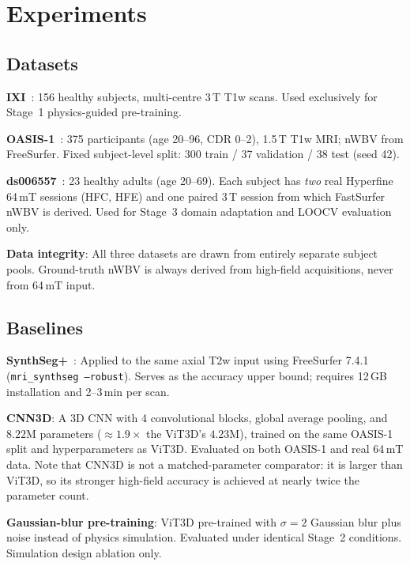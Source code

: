\documentclass[12pt,a4paper]{article}
\begin{document}
\section{Experiments}
\label{sec:experiments}

\subsection{Datasets}

\textbf{IXI}~\cite{ixi2017}: 156 healthy subjects, multi-centre 3\,T T1w
scans. Used exclusively for Stage~1 physics-guided pre-training.

\textbf{OASIS-1}~\cite{marcus2007oasis}: 375 participants (age 20--96,
CDR 0--2), 1.5\,T T1w MRI; nWBV from FreeSurfer. Fixed subject-level split:
300 train / 37 validation / 38 test (seed 42).

\textbf{ds006557}~\cite{vasa2025}: 23 healthy adults (age 20--69). Each
subject has \emph{two} real Hyperfine 64\,mT sessions (HFC, HFE) and one
paired 3\,T session from which FastSurfer nWBV is derived. Used for Stage~3
domain adaptation and LOOCV evaluation only.

\textbf{Data integrity}: All three datasets are drawn from entirely separate
subject pools. Ground-truth nWBV is always derived from high-field
acquisitions, never from 64\,mT input.

\subsection{Baselines}

\textbf{SynthSeg+}~\cite{billot2023synthseg}: Applied to the same axial
T2w input using FreeSurfer 7.4.1 (\texttt{mri\_synthseg --robust}).
Serves as the accuracy upper bound; requires 12\,GB installation and
2--3\,min per scan.

\textbf{CNN3D}: A 3D CNN with 4 convolutional blocks, global average
pooling, and $8.22$M parameters ($\approx 1.9\times$ the ViT3D's $4.23$M),
trained on the same OASIS-1 split and hyperparameters as ViT3D. Evaluated
on both OASIS-1 and real 64\,mT data. Note that CNN3D is not a
matched-parameter comparator: it is larger than ViT3D, so its stronger
high-field accuracy is achieved at nearly twice the parameter count.

\textbf{Gaussian-blur pre-training}: ViT3D pre-trained with $\sigma = 2$
Gaussian blur plus noise instead of physics simulation. Evaluated under
identical Stage~2 conditions. Simulation design ablation only.
\end{document}
